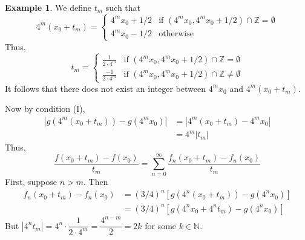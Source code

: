 \documentclass[11pt]{article}
\theoremstyle{definition}
\newtheorem{exmp}[thm]{Example}
\newcommand{\mbN}{\ensuremath{\mathbb{N}}}
\newcommand{\mbZ}{\ensuremath{\mathbb{Z}}}
\begin{document}
\begin{exmp}
We define $t_m$ such that
$$4^m(x_0 + t_m) = \begin{cases} 4^m x_0 + 1/2 & \text{if } (4^m x_0, 4^m x_0 + 1/2) \cap \mbZ = \emptyset \\ 4^m x_0 - 1/2 & \text{otherwise} \end{cases}$$
Thus,
$$t_m = \begin{cases} \frac{1}{2 \cdot 4^m} & \text{if } (4^m x_0, 4^m x_0 + 1/2) \cap \mbZ = \emptyset \\ \frac{-1}{2 \cdot 4^m} & \text{if } (4^m x_0, 4^m x_0 + 1/2) \cap \mbZ \ne \emptyset \end{cases}$$
It follows that there does not exist an integer between $4^m x_0$ and $4^m (x_0 + t_m)$.

Now by condition (I),
\begin{align*}
\left| g\left(4^m (x_0 + t_m)\right) - g(4^m x_0) \right|
& = \left| 4^m (x_0 + t_m) - 4^m x_0 \right| \\
& = 4^m |t_m|
\end{align*}
Thus,
$$\frac{f(x_0 + t_m) - f(x_0)}{t_m} = \sum_{n=0}^\infty \frac{f_n(x_0 + t_m) - f_n(x_0)}{t_m}$$
First, suppose $n > m$. Then
\begin{align*}
f_n(x_0 + t_m) - f_n(x_0) 
& = (3/4)^n \left[ g\left(4^n (x_0 + t_m)\right) - g(4^n x_0) \right] \\
& = (3/4)^n \left[ g(4^n x_0 + 4^n t_m) - g(4^n x_0) \right]
\end{align*}
But $|4^n t_m| = 4^n \cdot \dfrac{1}{2 \cdot 4^m} = \dfrac{4^{n-m}}2 = 2k$ for some $k \in \mbN$.


\end{exmp}
\end{document}
